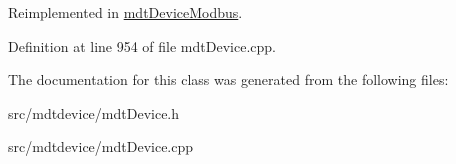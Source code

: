 Reimplemented in \hyperlink{classmdt_device_modbus_aad3ce85a19307e3056b940da99fe512b}{mdtDeviceModbus}.



Definition at line 954 of file mdtDevice.cpp.



The documentation for this class was generated from the following files:\begin{DoxyCompactItemize}
\item 
src/mdtdevice/mdtDevice.h\item 
src/mdtdevice/mdtDevice.cpp\end{DoxyCompactItemize}
